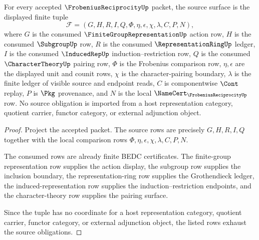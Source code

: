 \begin{theorem}\label{thm:frobenius-reciprocity-source-obligations}
For every accepted $\FrobeniusReciprocityUp$ packet, the source surface is the displayed finite tuple
$$
\mathcal{F}=(G,H,R,I,Q,\Phi,\eta,\epsilon,\chi,\lambda,C,P,N),
$$
where $G$ is the consumed $\FiniteGroupRepresentationUp$ action row, $H$ is the consumed $\SubgroupUp$ row, $R$ is the consumed $\RepresentationRingUp$ ledger, $I$ is the consumed $\InducedRepUp$ induction--restriction row, $Q$ is the consumed $\CharacterTheoryUp$ pairing row, $\Phi$ is the Frobenius comparison row, $\eta,\epsilon$ are the displayed unit and counit rows, $\chi$ is the character-pairing boundary, $\lambda$ is the finite ledger of visible source and endpoint reads, $C$ is componentwise $\Cont$ replay, $P$ is $\Pkg$ provenance, and $N$ is the local $\NameCert_{\FrobeniusReciprocityUp}$ row. No source obligation is imported from a host representation category, quotient carrier, functor category, or external adjunction object.
\end{theorem}
\begin{proof}
Project the accepted packet. The source rows are precisely $G,H,R,I,Q$ together with the local comparison rows $\Phi,\eta,\epsilon,\chi,\lambda,C,P,N$.

The consumed rows are already finite BEDC certificates. The finite-group representation row supplies the action display, the subgroup row supplies the inclusion boundary, the representation-ring row supplies the Grothendieck ledger, the induced-representation row supplies the induction--restriction endpoints, and the character-theory row supplies the pairing surface.

Since the tuple has no coordinate for a host representation category, quotient carrier, functor category, or external adjunction object, the listed rows exhaust the source obligations.
\end{proof}

